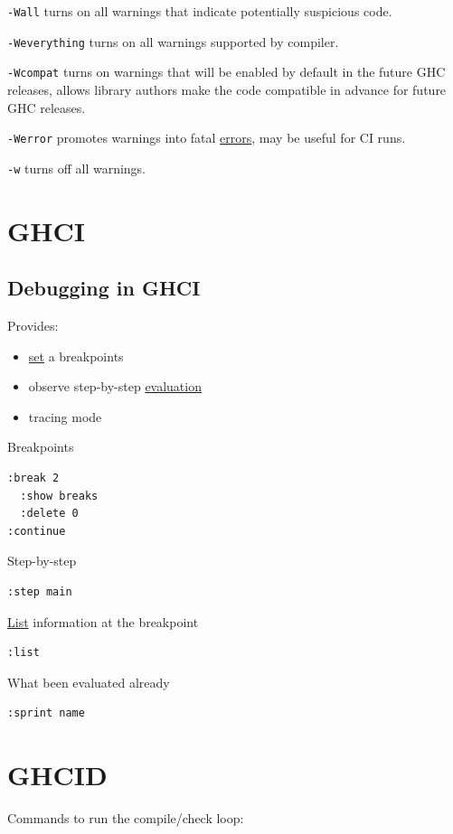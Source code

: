 \documentclass[a4paper,14pt,oneside]{book}
\begin{document}
\texttt{-Wall} turns on all warnings that indicate potentially suspicious code.

\texttt{-Weverything} turns on all warnings supported by compiler.

\texttt{-Wcompat} turns on warnings that will be enabled by default in the future GHC releases, allows library authors make the code compatible in advance for future GHC releases.

\texttt{-Werror} promotes warnings into fatal \hyperref[org7fe27f6]{errors}, may be useful for CI runs.

\texttt{-w} turns off all warnings.

\chapter{GHCI}
\label{sec:org0a7cb54}
\section{Debugging in GHCI}
\label{sec:orgea3782c}

Provides:
\begin{itemize}
\item \hyperref[org8d6310c]{set} a breakpoints
\item observe step-by-step \hyperref[org900e39c]{evaluation}
\item tracing mode
\end{itemize}

Breakpoints
\begin{verbatim}
:break 2
  :show breaks
  :delete 0
:continue
\end{verbatim}

Step-by-step
\begin{verbatim}
:step main
\end{verbatim}

\hyperref[org4f1d7eb]{List} information at the breakpoint
\begin{verbatim}
:list
\end{verbatim}

What been evaluated already
\begin{verbatim}
:sprint name
\end{verbatim}

\chapter{GHCID}
\label{sec:orgc5888a7}

Commands to run the compile/check loop:
\end{document}

